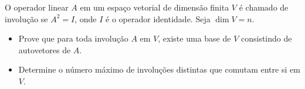 O operador linear \(A\) em um espaço vetorial de dimensão finita \(V\) é chamado de involução se \(A^{2}=I\), onde \(I\) é o operador identidade. Seja \(\dim V=n\).
\begin{itemize}
    \item[(a)] Prove que para toda involução \(A\) em \(V\), existe uma base de \(V\) consistindo de autovetores de \(A\).
    \item[(b)] Determine o número máximo de involuções distintas que comutam entre si em \(V\).
\end{itemize}

